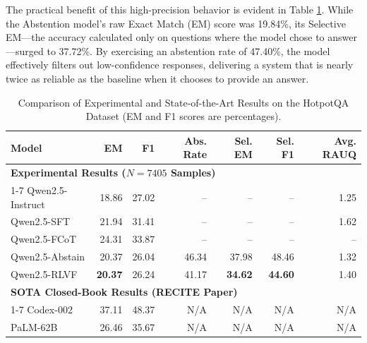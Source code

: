 \documentclass{article}
\begin{document}
The practical benefit of this high-precision behavior is evident in Table \ref{tab:hotpotqa_comparison}. While the Abstention model's raw Exact Match (EM) score was 19.84\%, its Selective EM—the accuracy calculated only on questions where the model chose to answer—surged to 37.72\%. By exercising an abstention rate of 47.40\%, the model effectively filters out low-confidence responses, delivering a system that is nearly twice as reliable as the baseline when it chooses to provide an answer.


\begin{table}[H]
\centering
\caption{Comparison of Experimental and State-of-the-Art Results on the HotpotQA Dataset (EM and F1 scores are percentages).}
\label{tab:hotpotqa_comparison}
\begin{tabular}{lrrrrrr}
    \toprule
    \textbf{Model} & \textbf{EM} & \textbf{F1} & \textbf{Abs. Rate} & \textbf{Sel. EM} & \textbf{Sel. F1} & \textbf{Avg. RAUQ} \\
    \midrule
    \multicolumn{7}{l}{\textbf{Experimental Results ($N=7405$ Samples)}} \\
    \cmidrule(lr){1-7}
    Qwen2.5-Instruct & 18.86 & 27.02 & -- & -- & -- & 1.25 \\
    Qwen2.5-SFT & 21.94 & 31.41 & -- & -- & -- & 1.62 \\
    Qwen2.5-FCoT & 24.31 & 33.87 & -- & -- & -- & -- \\
    Qwen2.5-Abstain & 20.37 & 26.04 & 46.34 & 37.98 & 48.46 & 1.32 \\
    Qwen2.5-RLVF & \textbf{20.37} & 26.24 & 41.17 & \textbf{34.62} & \textbf{44.60} & 1.40 \\
    \midrule
    \multicolumn{7}{l}{\textbf{SOTA Closed-Book Results (RECITE Paper)}} \\
    \cmidrule(lr){1-7}
    Codex-002 & 37.11 & 48.37 & N/A & N/A & N/A & N/A \\
    PaLM-62B & 26.46 & 35.67 & N/A & N/A & N/A & N/A \\
    \bottomrule
\end{tabular}
\end{table}
\end{document}
